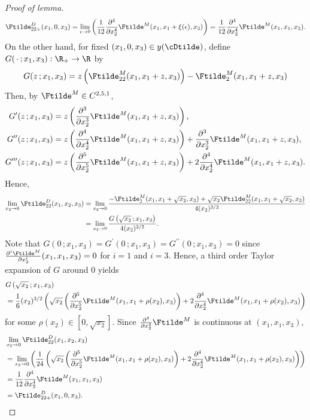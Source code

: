 \documentclass[11pt]{article}
\begin{document}
\begin{proof}[Proof of lemma]
$$
\Ftilde^D_{22+}(x_1, 0, x_3) = \lim_{\epsilon \to 0}  \left( \frac{1}{12} \frac{\partial^4}{\partial x_2^4} \Ftilde^M(x_1, x_1 + \xi(\epsilon), x_3) \right) =  \frac{1}{12} \frac{\partial^4}{\partial x_2^4} \Ftilde^M(x_1, x_1, x_3).
$$
On the other hand, for fixed $(x_1, 0, x_3) \in y(\cDtilde)$, define $G( \, \cdot \, ; x_1, x_3): \R_+ \to \R$ by
$$
G(z \,; x_1, x_3) =  z \left( \Ftilde^M_{22}(x_1, x_1 + z, x_3) \right)  - \Ftilde^M_{2}(x_1, x_1 + z, x_3)
$$
Then, by $\Ftilde^M \in C^{2,5,1}$,
\begin{align*}
G^\prime(z \,; x_1, x_3) &= z \left( \frac{\partial^3}{\partial x_2^3} \Ftilde^M(x_1, x_1 + z, x_3) \right), \\
G^{\prime\prime}(z \,; x_1, x_3) &=  z \left( \frac{\partial^4}{\partial x_2^4} \Ftilde^M(x_1, x_1 + z, x_3) \right) + \frac{\partial^3}{\partial x_2^3} \Ftilde^M(x_1, x_1 + z, x_3), \\
G^{\prime\prime\prime}(z \,; x_1, x_3) &=  z \left( \frac{\partial^5}{\partial x_2^5} \Ftilde^M(x_1, x_1 + z, x_3) \right) + 2 \frac{\partial^4}{\partial x_2^4} \Ftilde^M(x_1, x_1 + z, x_3).
\end{align*}
Hence,
\begin{align*}
\lim_{x_2 \to 0} \Ftilde^D_{22}(x_1, x_2, x_3) &= \lim_{x_2 \to 0} \frac{- \Ftilde^M_2(x_1,x_1 + \sqrt{x_2}, x_3) + \sqrt{x_2} \Ftilde^M_{22}(x_1, x_1 + \sqrt{x_2}, x_3)}{4 (x_2)^{3/2}} \\
&= \lim_{x_2 \to 0} \frac{ G\left( \sqrt{x_2} \,; x_1, x_3 \right) }{4 (x_2)^{3/2}}.
\end{align*}
Note that $G(0 \,; x_1, x_3) = G^{\prime}(0 \,; x_1, x_3) = G^{\prime\prime}(0 \,; x_1, x_3) = 0$ since $\frac{\partial^i\Ftilde^M}{\partial x_2^i}(x_1, x_1, x_3) = 0$ for $i = 1$ and $i = 3$. Hence, a third order Taylor expansion of $G$ around $0$ yields
\begin{align*}
&G\left( \sqrt{x_2} \,; x_1, x_3 \right) \\
&= \frac{1}{6} (x_2)^{3/2} \left( \sqrt{x_2} \left( \frac{\partial^5}{\partial x_2^5} \Ftilde^M(x_1, x_1 + \rho(x_2), x_3) \right) + 2 \frac{\partial^4}{\partial x_2^4} \Ftilde^M(x_1, x_1 + \rho(x_2), x_3) \right)
\end{align*}
for some $\rho(x_2) \in [0,\sqrt{x_2}]$. Since $\frac{\partial^4}{\partial x_2^4} \Ftilde^M$ is continuous at $(x_1, x_1, x_3)$,
\begin{align*}
&\lim_{x_2 \to 0} \Ftilde^D_{22}(x_1, x_2, x_3) \\
&= \lim_{x_2 \to 0} \left( \frac{1}{24} \left( \sqrt{x_2} \left( \frac{\partial^5}{\partial x_2^5} \Ftilde^M(x_1, x_1 + \rho(x_2), x_3) \right) + 2 \frac{\partial^4}{\partial x_2^4} \Ftilde^M(x_1, x_1 + \rho(x_2), x_3) \right) \right) \\
%
%
%
&= \frac{1}{12} \frac{\partial^4}{\partial x_2^4} \Ftilde^M(x_1, x_1, x_3) \\
&= \Ftilde^D_{22+}(x_1, 0, x_3).
\end{align*}

\end{proof}
\end{document}
